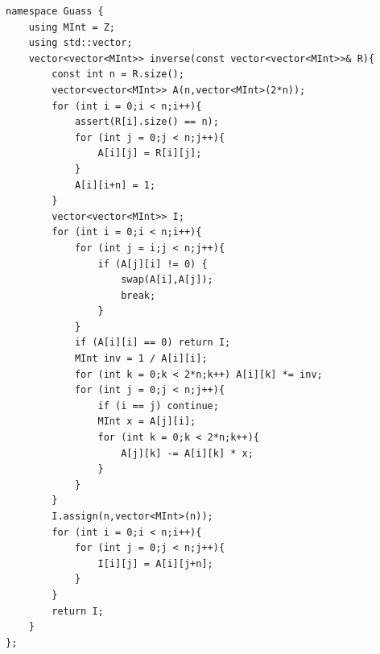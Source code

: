 \begin{lstlisting}
namespace Guass {
    using MInt = Z;
    using std::vector;
    vector<vector<MInt>> inverse(const vector<vector<MInt>>& R){
        const int n = R.size();
        vector<vector<MInt>> A(n,vector<MInt>(2*n));
        for (int i = 0;i < n;i++){
            assert(R[i].size() == n);
            for (int j = 0;j < n;j++){
                A[i][j] = R[i][j];
            }
            A[i][i+n] = 1;
        }
        vector<vector<MInt>> I;
        for (int i = 0;i < n;i++){
            for (int j = i;j < n;j++){
                if (A[j][i] != 0) {
                    swap(A[i],A[j]);
                    break;
                }
            }
            if (A[i][i] == 0) return I;
            MInt inv = 1 / A[i][i];
            for (int k = 0;k < 2*n;k++) A[i][k] *= inv;
            for (int j = 0;j < n;j++){
                if (i == j) continue;
                MInt x = A[j][i];
                for (int k = 0;k < 2*n;k++){
                    A[j][k] -= A[i][k] * x;
                }
            }
        }
        I.assign(n,vector<MInt>(n));
        for (int i = 0;i < n;i++){
            for (int j = 0;j < n;j++){
                I[i][j] = A[i][j+n];
            }
        }
        return I;
    }
};
\end{lstlisting}
